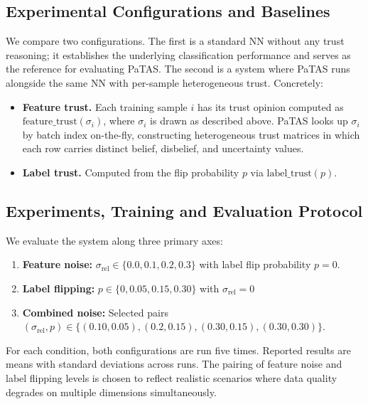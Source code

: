 \subsection{Experimental Configurations and Baselines}
\label{sec:configs}
We compare two configurations. The first
is a standard \ac{NN} without any trust reasoning; it establishes the underlying classification performance and serves as the reference for evaluating \ac{PaTAS}. The second
 is a system where \ac{PaTAS} runs alongside the same \ac{NN} with per-sample heterogeneous trust.
Concretely:
\begin{itemize}
  \item \textbf{Feature trust.} Each training sample $i$ has its trust opinion computed as $\text{feature\_trust}(\sigma_i)$, where $\sigma_i$ is drawn as described above. \ac{PaTAS} looks up $\sigma_i$ by batch index on-the-fly, constructing heterogeneous trust matrices in which each row carries distinct belief, disbelief, and uncertainty values.
  \item \textbf{Label trust.} Computed from the flip probability $p$ via $\text{label\_trust}(p)$.
\end{itemize}



\subsection{Experiments, Training and Evaluation Protocol}
\label{sec:exp_axes}

We evaluate the system along three primary axes:
\begin{enumerate}
    \item \textbf{Feature noise:} $\sigma_{\text{rel}} \in \{0.0, 0.1, 0.2, 0.3\}$ with label flip probability $p = 0$.
    \item \textbf{Label flipping:} $p \in  \{0, 0.05, 0.15, 0.30\}$ with  $\sigma_{\text{rel}} = 0$
    \item \textbf{Combined noise:} Selected pairs $(\sigma_{\text{rel}}, p) \in \{(0.10, 0.05), (0.2, 0.15), (0.30, 0.15), (0.30, 0.30)\}$.
\end{enumerate}
For each condition, both configurations are run five times. Reported results are means with standard deviations across runs. The pairing of feature noise and label flipping levels is chosen to reflect realistic scenarios where data quality degrades on multiple dimensions simultaneously.


